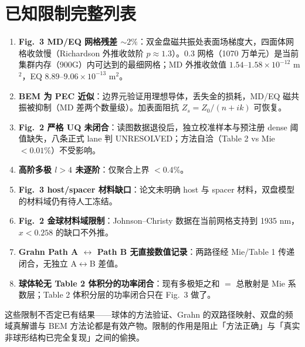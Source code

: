 \section{已知限制完整列表}

\begin{enumerate}
  \item \textbf{Fig.~3 MD/EQ 网格残差 $\sim2\%$}：双金盘磁共振处表面场梯度大，四面体网格收敛慢（Richardson 外推收敛阶 $p\approx1.3$）。$0.3$ 网格（1070 万单元）是当前集群内存（900G）内可达到的最细网格；MD 外推收敛值 $1.54$--$1.58\times10^{-12}$ m$^2$，EQ $8.89$--$9.06\times10^{-13}$ m$^2$。
  \item \textbf{BEM 为 PEC 近似}：边界元验证用理想导体，丢失金的损耗，MD/EQ 磁共振被抑制（MD 差两个数量级）。加表面阻抗 $Z_s=Z_0/(n+ik)$ 可恢复。
  \item \textbf{Fig.~2 严格 UQ 未闭合}：读图数据退役后，独立校准样本与预注册 dense 阈值缺失，八条正式 lane 判 UNRESOLVED；方法自洽（Table 2 vs Mie $<0.01\%$）不受影响。
  \item \textbf{高阶多极 $l>4$ 未逐阶}：仅聚合上界 $<0.4\%$。
  \item \textbf{Fig.~3 host/spacer 材料缺口}：论文未明确 host 与 spacer 材料，双盘模型的材料域仍有待人工冻结。
  \item \textbf{Fig.~2 金球材料域限制}：Johnson--Christy 数据在当前网格支持到 1935 nm，$x<0.258$ 的缺口不外推。
  \item \textbf{Grahn Path A $\leftrightarrow$ Path B 无直接数值记录}：两路径经 Mie/Table 1 传递闭合，无独立 A$\leftrightarrow$B 差值。
  \item \textbf{球体轮无 Table 2 体积分的功率闭合}：现有多极矩之和 $=$ 总散射是 Mie 系数层；Table 2 体积分层的功率闭合只在 Fig.~3 做了。
\end{enumerate}

这些限制不否定已有结果——球体的方法验证、Grahn 的双路径映射、双盘的频域真解谱与 BEM 方法论都是有效产物。限制的作用是阻止「方法正确」与「真实非球形结构已完全复现」之间的偷换。

